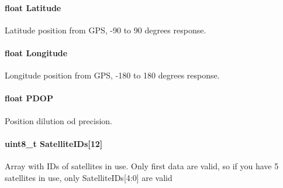 \paragraph[{Latitude}]{\setlength{\rightskip}{0pt plus 5cm}float Latitude}\label{struct_t_m___g_p_s___data__t_a81398e75d8a39d3b3ef55b4da09fcfe3}
Latitude position from G\+P\+S, -\/90 to 90 degrees response. \hypertarget{struct_t_m___g_p_s___data__t_a2e2415e2fa561522c450fab2302b2e98}{}
\paragraph[{Longitude}]{\setlength{\rightskip}{0pt plus 5cm}float Longitude}\label{struct_t_m___g_p_s___data__t_a2e2415e2fa561522c450fab2302b2e98}
Longitude position from G\+P\+S, -\/180 to 180 degrees response. \hypertarget{struct_t_m___g_p_s___data__t_a6dd866c20bf7ae6fed7f62afc4470c89}{}
\paragraph[{P\+D\+O\+P}]{\setlength{\rightskip}{0pt plus 5cm}float P\+D\+O\+P}\label{struct_t_m___g_p_s___data__t_a6dd866c20bf7ae6fed7f62afc4470c89}
Position dilution od precision. \hypertarget{struct_t_m___g_p_s___data__t_a8173b8ba1d29304a2daac7364773666e}{}
\paragraph[{Satellite\+I\+Ds}]{\setlength{\rightskip}{0pt plus 5cm}uint8\+\_\+t Satellite\+I\+Ds\mbox{[}12\mbox{]}}\label{struct_t_m___g_p_s___data__t_a8173b8ba1d29304a2daac7364773666e}
Array with I\+Ds of satellites in use. Only first data are valid, so if you have 5 satellites in use, only Satellite\+I\+Ds\mbox{[}4\+:0\mbox{]} are valid \hypertarget{struct_t_m___g_p_s___data__t_a0f88ecbf6fdf3e37c7f68680f6f88a40}{}
